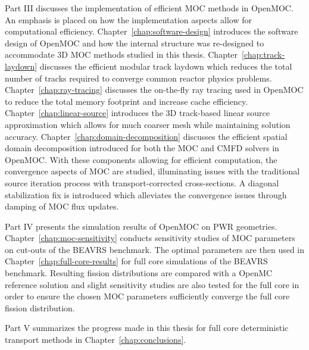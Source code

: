 Part III discusses the implementation of efficient \ac{MOC} methods in OpenMOC. An emphasis is placed on how the implementation aspects allow for computational efficiency. Chapter~\ref{chap:software-design} introduces the software design of OpenMOC and how the internal structure was re-designed to accommodate 3D \ac{MOC} methods studied in this thesis. Chapter~\ref{chap:track-laydown} discusses the efficient modular track laydown which reduces the total number of tracks required to converge common reactor physics problems. Chapter~\ref{chap:ray-tracing} discusses the on-the-fly ray tracing used in OpenMOC to reduce the total memory footprint and increase cache efficiency. Chapter~\ref{chap:linear-source} introduces the 3D track-based linear source approximation which allows for much coarser mesh while maintaining solution accuracy. Chapter~\ref{chap:domain-decomposition} discusses the efficient spatial domain decomposition introduced for both the \ac{MOC} and \ac{CMFD} solvers in OpenMOC. With these components allowing for efficient computation, the convergence aspects of \ac{MOC} are studied, illuminating issues with the traditional source iteration process with transport-corrected cross-sections. A diagonal stabilization fix is introduced which alleviates the convergence issues through damping of \ac{MOC} flux updates.

Part IV presents the simulation results of OpenMOC on \ac{PWR} geometries. Chapter~\ref{chap:moc-sensitivity} conducts sensitivity studies of \ac{MOC} parameters on cut-outs of the BEAVRS benchmark. The optimal parameters are then used in Chapter~\ref{chap:full-core-results} for full core simulations of the BEAVRS benchmark. Resulting fission distributions are compared with a OpenMC reference solution and slight sensitivity studies are also tested for the full core in order to ensure the chosen \ac{MOC} parameters sufficiently converge the full core fission distribution.

Part V summarizes the progress made in this thesis for full core deterministic transport methods in Chapter~\ref{chap:conclusions}.